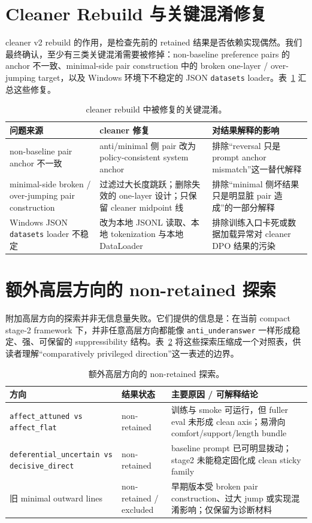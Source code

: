 \documentclass[12pt]{ctexart}
\begin{document}
\section{Cleaner Rebuild 与关键混淆修复}

cleaner v2 rebuild 的作用，是检查先前的 retained 结果是否依赖实现偶然。我们最终确认，至少有三类关键混淆需要被修掉：non-baseline preference pairs 的 anchor 不一致、minimal-side pair construction 中的 broken one-layer / over-jumping target，以及 Windows 环境下不稳定的 JSON \texttt{datasets} loader。表~\ref{tab:cleaner-rebuild-fixes} 汇总这些修复。

\begin{table}[t]
\centering
\caption{cleaner rebuild 中被修复的关键混淆。}
\label{tab:cleaner-rebuild-fixes}
\begin{tabular}{p{3.3cm}p{4.6cm}p{5.0cm}}
\toprule
问题来源 & cleaner 修复 & 对结果解释的影响 \\
\midrule
non-baseline pair anchor 不一致 & anti/minimal 侧 pair 改为 policy-consistent system anchor & 排除“reversal 只是 prompt anchor mismatch”这一替代解释 \\
minimal-side broken / over-jumping pair construction & 过滤过大长度跳跃；删除失效的 one-layer 设计；只保留 cleaner midpoint 线 & 排除“minimal 侧坏结果只是明显脏 pair 造成”的一部分解释 \\
Windows JSON \texttt{datasets} loader 不稳定 & 改为本地 JSONL 读取、本地 tokenization 与本地 DataLoader & 排除训练入口卡死或数据加载异常对 cleaner DPO 结果的污染 \\
\bottomrule
\end{tabular}
\end{table}

\section{额外高层方向的 non-retained 探索}

附加高层方向的探索并非无信息量失败。它们提供的信息是：在当前 compact stage-2 framework 下，并非任意高层方向都能像 \texttt{anti\_underanswer} 一样形成稳定、强、可保留的 suppressibility 结构。表~\ref{tab:extra-directions} 将这些探索压缩成一个对照表，供读者理解“comparatively privileged direction”这一表述的边界。

\begin{table}[t]
\centering
\caption{额外高层方向的 non-retained 探索。}
\label{tab:extra-directions}
\begin{tabular}{p{3.9cm}p{3.6cm}p{5.2cm}}
\toprule
方向 & 结果状态 & 主要原因 / 可解释结论 \\
\midrule
\texttt{affect\_attuned vs affect\_flat} & non-retained & 训练与 smoke 可运行，但 fuller eval 未形成 clean axis；易滑向 comfort/support/length bundle \\
\texttt{deferential\_uncertain vs decisive\_direct} & non-retained & baseline prompt 已可明显拨动；stage2 未能稳定固化成 clean sticky family \\
旧 minimal outward lines & non-retained / excluded & 早期版本受 broken pair construction、过大 jump 或实现混淆影响；仅保留为诊断材料 \\
\bottomrule
\end{tabular}
\end{table}
\end{document}

